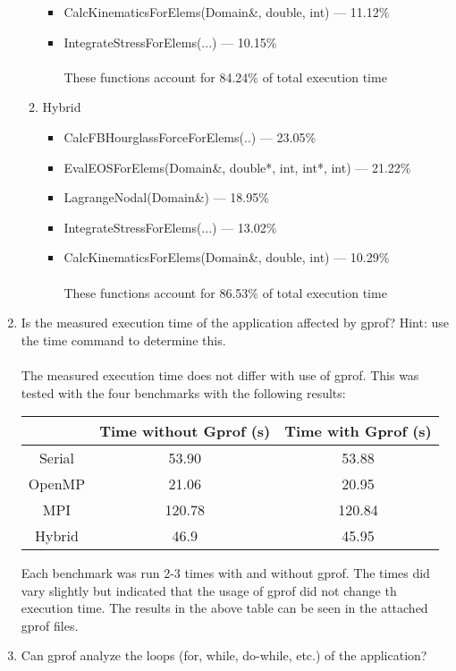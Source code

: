 \documentclass{article}
\begin{document}
\begin{enumerate}
\begin{enumerate}
\begin{itemize}
		\item{CalcKinematicsForElems(Domain\&, double, int) --- 11.12\%}
		\item{IntegrateStressForElems(...) --- 10.15\%}
\\\\These functions account for 84.24\% of total execution time
	\end{itemize}
	\item{Hybrid}
	\begin{itemize}
		\item{CalcFBHourglassForceForElems(..) --- 23.05\%}											\item{EvalEOSForElems(Domain\&, double*, int, int*, int) --- 21.22\%}
		\item{LagrangeNodal(Domain\&) --- 18.95\%}
		\item{IntegrateStressForElems(...) --- 13.02\%}
		\item{CalcKinematicsForElems(Domain\&, double, int) --- 10.29\%}
\\\\These functions account for 86.53\% of total execution time
	\end{itemize}
\end{enumerate}
\item{Is the measured execution time of the application affected by gprof? Hint: use the time command to determine this.}\\\\
The measured execution time does not differ with use of gprof. This was tested with the four benchmarks with the following results:
\begin{center}
\begin{tabular}{|c|c|c|}
\hline
&Time without Gprof (s) & Time with Gprof (s)\\
\hline
Serial &53.90&53.88\\ \hline
OpenMP &21.06&20.95\\ \hline
MPI &120.78&120.84\\ \hline
Hybrid &46.9&45.95\\ \hline
\end{tabular}
\end{center}
Each benchmark was run 2-3 times with and without gprof. The times did vary slightly but indicated that the usage of gprof did not change th execution time. The results in the above table can be seen in the attached gprof files.
\item{Can gprof analyze the loops (for, while, do-while, etc.) of the application?}\\\\

\end{enumerate}
\end{document}
